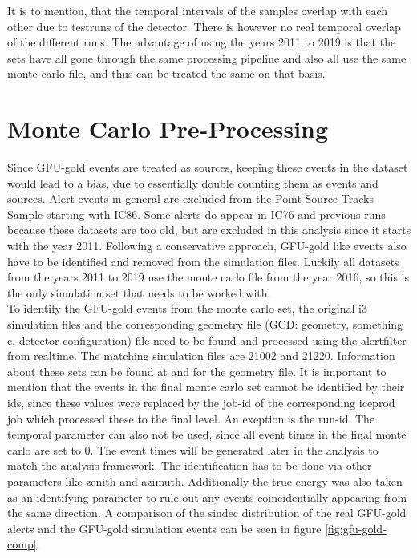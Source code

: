 It is to mention, that the temporal intervals of the samples overlap with each other due to testruns of the detector.
There is however no real temporal overlap of the different runs. \cite{private_com}
The advantage of using the years 2011 to 2019 is that the sets have all gone through the same processing pipeline and also all use the same monte carlo file, and thus can be treated the same on that basis.

\section{Monte Carlo Pre-Processing}

Since GFU-gold events are treated as sources, keeping these events in the dataset would lead to a bias, due to essentially double counting them as events and sources.
Alert events in general are excluded from the Point Source Tracks Sample starting with IC86.
Some alerts do appear in IC76 and previous runs because these datasets are too old, but are excluded in this analysis since it starts with the year 2011.
Following a conservative approach, GFU-gold like events also have to be identified and removed from the simulation files.
Luckily all datasets from the years 2011 to 2019 use the monte carlo file from the year 2016, so this is the only simulation set that needs to be worked with.\\
To identify the GFU-gold events from the monte carlo set, the original i3 simulation files and the corresponding geometry file (GCD: geometry, something c, detector configuration) file need to be found and processed using the alertfilter from realtime.
The matching simulation files are 21002 and 21220.
Information about these sets can be found at \cite{sim} and \cite{gcd} for the geometry file.
It is important to mention that the events in the final monte carlo set cannot be identified by their ids, since these values were replaced by the job-id of the corresponding iceprod job which processed these to the final level. An exeption is the run-id.
The temporal parameter can also not be used, since all event times in the final monte carlo are set to \num{0}.
The event times will be generated later in the analysis to match the analysis framework.
The identification has to be done via other parameters like zenith and azimuth.
Additionally the true energy was also taken as an identifying parameter to rule out any events coincidentially appearing from the same direction.
A comparison of the sindec distribution of the real GFU-gold alerts and the GFU-gold simulation events can be seen in figure \ref{fig:gfu-gold-comp}.


